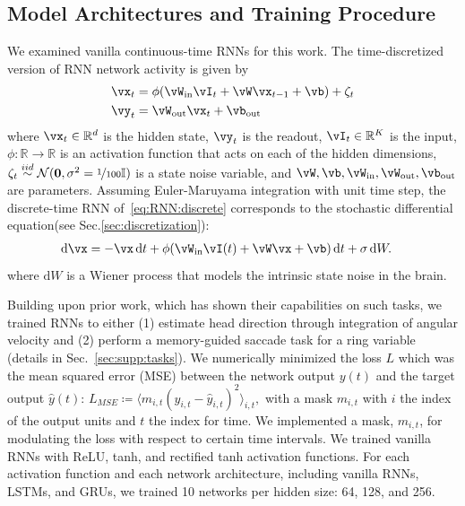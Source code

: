 \documentclass{article} %
\newcounter{ct}
\newcommand{\dm}[1]{\ensuremath{\mathrm{d}{#1}}} %
\newcommand{\win}{\vW_{\text{in}}}
\newcommand{\wout}{\vW_{\text{out}}}
\newcommand{\bout}{\vb_{\text{out}}}
\newcommand{\reals}{\mathbb{R}}
\newcommand{\iidsample}{\stackrel{iid}{\sim}}
\newcommand{\identity}{\ensuremath{\mathbb{I}}}
\theoremstyle{definition}
\theoremstyle{remark}
\begin{document}
\subsection{Model Architectures and Training Procedure}
We examined vanilla continuous-time RNNs for this work.
The time-discretized version of RNN network activity is given by
\begin{equation}
  \begin{aligned}
	\vx_t &= \phi(\win \vI_t + \vW \vx_{t-1} + \vb) + \zeta_t \label{eq:RNN:discrete}\\
	\vy_t &= \wout \vx_t + \bout
  \end{aligned}
\end{equation}
where \(\vx_t \in \reals^d\) is the hidden state,
\(\vy_t \) is the readout,
\(\vI_t \in \reals^K\) is the input,
\(\phi\colon \reals \to \reals\) is an activation function that acts on each of the hidden dimensions,
 \(\zeta_t\iidsample\mathcal{N}(\mathbf{0},\sigma^2 = \nicefrac{1}{100}\identity)\) is a state noise variable, and %
\(\vW, \vb, \win, \wout, \bout\) are parameters.
Assuming Euler-Maruyama integration with unit time step, the discrete-time RNN of~\eqref{eq:RNN:discrete} corresponds to the stochastic differential equation(see Sec.\ref{sec:discretization}):
\begin{align}
    \dm{\vx} &= -\vx\,\dm{t} + \phi(\win \vI(t) + \vW \vx + \vb)\,\dm{t} + \sigma\,\dm{W}. \label{eq:RNN:continuous}
\end{align}
where \(\dm{W}\) is a Wiener process that models the intrinsic state noise in the brain.

Building upon prior work, which has shown their capabilities on such tasks, we trained RNNs to either
(1) estimate head direction through integration of angular velocity \citep{cueva2019headdirection,cueva2021continuous}
and (2) perform a memory-guided saccade task for a ring variable \citep{wimmer2014} (details in Sec.~\ref{sec:supp:tasks}).
We numerically minimized the loss \(L\) which was the mean squared error (MSE) between the network output \(y(t)\) and the target output \(\hat y(t)\):
\(L_{MSE} \coloneqq \langle m_{i,t}(y_{i,t}-\hat y_{i,t})^2\rangle_{i,t}, \)
with a mask \(m_{i,t}\) with \(i\) the index of the output units and \(t\)  the index for time.
We implemented a mask, \(m_{i,t}\), for modulating the loss with respect to certain time intervals.
We trained vanilla RNNs with ReLU, tanh, and rectified tanh activation functions. For each activation function and each network architecture, including vanilla RNNs, LSTMs, and GRUs, we trained 10 networks per hidden size: 64, 128, and 256.
\end{document}
